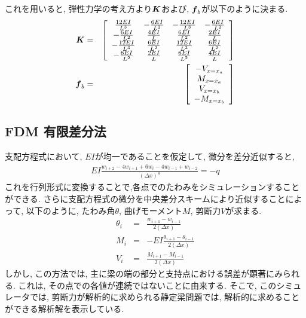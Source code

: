 \documentclass{jsarticle}
\begin{document}
これを用いると, 弾性力学の考え方より$\mbox{\boldmath $K$}$および, $\mbox{\boldmath $f$}_b$が以下のように決まる.
\renewcommand{\arraystretch}{1.3}
\begin{eqnarray*}
\mbox{\boldmath $K$} &=& \left[
\begin{array}{cccc}
\frac{12EI}{L^3} & -\frac{6EI}{L^2} & -\frac{12EI}{L^3} & -\frac{6EI}{L^2} \\
-\frac{6EI}{L^2} & \frac{4EI}{L} & \frac{6EI}{L^2} & \frac{2EI}{L} \\
-\frac{12EI}{L^3} & \frac{6EI}{L^2} & \frac{12EI}{L^3} & \frac{6EI}{L^2} \\
-\frac{6EI}{L^2} & \frac{2EI}{L} & \frac{6EI}{L^2} & \frac{4EI}{L}
\end{array}\right] \\
\mbox{\boldmath $f$}_b &=& \left[
\begin{array}{c}
-V_{x=x_a} \\
M_{x=x_a} \\
V_{x=x_b} \\
-M_{x=x_b}
\end{array}\right]
\end{eqnarray*}


\subsection{FDM 有限差分法}
支配方程式において, $EI$が均一であることを仮定して, 微分を差分近似すると,
\begin{eqnarray}
EI\frac{w_{i+2}-4w_{i+1}+6w_i-4w_{i-1}+w_{i-2}}{(\Delta x)^4} = -q
\end{eqnarray}
これを行列形式に変換することで,各点でのたわみをシミュレーションすることができる. さらに支配方程式の微分を中央差分スキームにより近似することによって, 以下のように, たわみ角$\theta$, 曲げモーメント$M$, 剪断力$V$が求まる.
\begin{eqnarray*}
\theta_i &=& \frac{w_{i+1}-w_{i-1}}{2(\Delta x)} \\
M_i &=& -EI\frac{\theta_{i+1}-\theta_{i-1}}{2(\Delta x)} \\
V_i &=& \frac{M_{i+1}-M_{i-1}}{2(\Delta x)}
\end{eqnarray*}
しかし, この方法では, 主に梁の端の部分と支持点における誤差が顕著にみられる. これは, その点での各値が連続ではないことに由来する. そこで, このシミュレータでは, 剪断力が解析的に求められる静定梁問題では, 解析的に求めることができる解析解を表示している.
\end{document}

